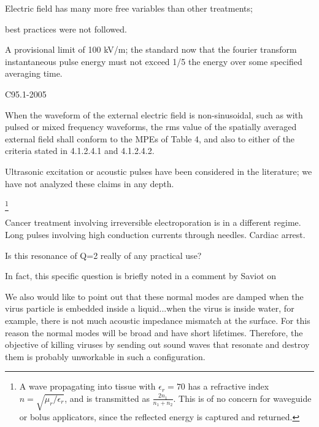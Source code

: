 \documentclass[paper.tex]{subfiles}
\begin{document}
\begin{multicols}{1}
Electric field has many more free variables than other treatments; 



best practices were not followed.





A provisional limit of 100 kV/m; the standard now that the fourier transform instantaneous pulse energy must not exceed 1/5 the energy over some specified averaging time.

C95.1-2005


When the waveform of the external electric field is non-sinusoidal, such as with pulsed or mixed frequency
waveforms, the rms value of the spatially averaged external field shall conform to the MPEs of Table 4, and
also to either of the criteria stated in 4.1.2.4.1 and 4.1.2.4.2.

 
Ultrasonic excitation or acoustic pulses have been considered in the literature; we have not analyzed these claims in any depth.







\footnote{A wave propagating into tissue with $\epsilon_r=70$ has a refractive index $n=\sqrt{\mu_r/\epsilon_r}$, and is transmitted as $\frac{2 n_1}{n_1 + n_2}$. This is of no concern for waveguide or bolus applicators, since the reflected energy is captured and returned.}






Cancer treatment involving irreversible electroporation is in a different regime. Long pulses involving high conduction currents through needles. Cardiac arrest.




Is this resonance of Q=2 really of any practical use?


In fact, this specific question is briefly noted in a comment by Saviot \cite{Comment2004} on 


\begin{fquote}
	We also would like to point out that these normal modes are damped when the virus particle is embedded inside a liquid...when the virus is inside water, for example, there is not much acoustic impedance mismatch at the surface. For this reason the normal modes will be broad and have short lifetimes. Therefore, the objective of killing viruses by sending out sound waves that resonate and destroy them is probably unworkable in such a configuration.	
\end{fquote}





\end{multicols}
\end{document}

